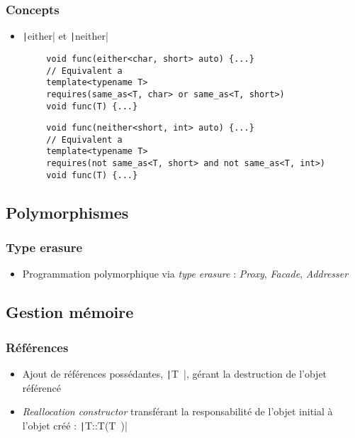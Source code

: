 \documentclass[C++.tex]{subfiles}
\begin{document}
\begin{frame}[fragile]
	\frametitle{Concepts}
	\begin{itemize}
		\item \texttt|either| et \texttt|neither|
	\end{itemize}

	\begin{verbatim}
		void func(either<char, short> auto) {...}
		// Equivalent a
		template<typename T>
		requires(same_as<T, char> or same_as<T, short>)
		void func(T) {...}
	\end{verbatim}

	\begin{verbatim}
		void func(neither<short, int> auto) {...}
		// Equivalent a
		template<typename T>
		requires(not same_as<T, short> and not same_as<T, int>)
		void func(T) {...}
	\end{verbatim}

\end{frame}

\subsection*{Polymorphismes}
\begin{frame}[fragile]
	\frametitle{Type erasure}
	\begin{itemize}
		\item Programmation polymorphique via \textit{type erasure} : \textit{Proxy}, \textit{Facade}, \textit{Addresser}

	\end{itemize}
\end{frame}

\subsection*{Gestion mémoire}
\begin{frame}[fragile]
	\frametitle{Références}
	\begin{itemize}
		\item Ajout de références possédantes, \texttt|T~|, gérant la destruction de l'objet référencé
		\item \textit{Reallocation constructor} transférant la responsabilité de l'objet initial à l'objet créé : \texttt|T::T(T~)|
	\end{itemize}

\end{frame}
\end{document}
